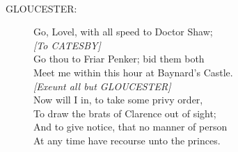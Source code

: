 \documentclass{article}
\begin{document}
\\
\begin{description}
\item[GLOUCESTER:] 
\hspace{1pt}Go, Lovel, with all speed to Doctor Shaw;\\
{\it [To CATESBY]}\\
\hspace{1pt}Go thou to Friar Penker; bid them both\\
\hspace{1pt}Meet me within this hour at Baynard's Castle.\\
{\it [Exeunt all but GLOUCESTER]}\\
\hspace{1pt}Now will I in, to take some privy order,\\
\hspace{1pt}To draw the brats of Clarence out of sight;\\
\hspace{1pt}And to give notice, that no manner of person\\
\hspace{1pt}At any time have recourse unto the princes.\\
\end{description}
\centering{\it [Exit]}\\
\end{document}
